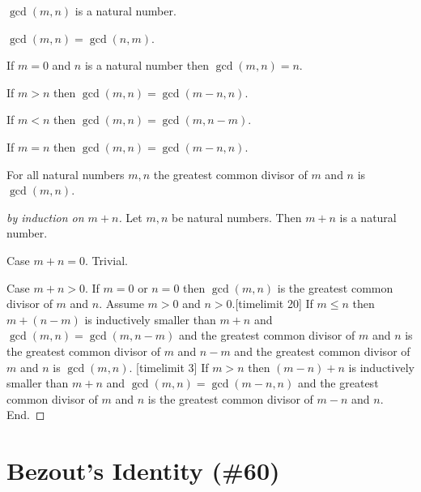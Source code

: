 \documentclass{article}
\begin{document}
\begin{forthel}
\begin{signature}
$\gcd(m,n)$ is a natural number.
\end{signature}

\begin{axiom}
$\gcd(m,n) = \gcd(n,m)$.
\end{axiom}

\begin{axiom}
If $m=0$ and $n$ is a natural number then $\gcd(m,n)=n$.
\end{axiom}
\begin{axiom}
If $m > n$ then $\gcd(m,n) = \gcd(m-n,n)$.
\end{axiom}
\begin{axiom}
If $m < n$ then $\gcd(m,n) = \gcd(m,n-m)$.
\end{axiom}
\begin{axiom}
If $m = n$ then $\gcd(m,n) = \gcd(m-n,n)$.
\end{axiom}


\begin{proposition}
For all natural numbers $m,n$ the greatest common divisor of $m$ and $n$ is $\gcd(m,n)$.
\end{proposition}
\begin{proof}[by induction on $m+n$]
Let $m,n$ be natural numbers.
Then $m+n$ is a natural number.

Case $m + n =0$. Trivial.

Case $m + n > 0$.
If $m=0$ or $n=0$ then $\gcd(m,n)$ is
the greatest common divisor of $m$ and $n$.
Assume $m>0$ and $n>0$.[timelimit 20]
If $m \leq n$ then $m + (n-m)$ is inductively smaller than $m + n$ and
$\gcd(m,n) = \gcd(m,n-m)$ and
the greatest common divisor of $m$ and $n$ is
the greatest common divisor of $m$ and $n-m$
and the greatest common divisor of $m$ and $n$ is $\gcd(m,n)$. [timelimit 3]
If $m > n$ then $(m-n) + n$ is inductively smaller than $m + n$ and
$\gcd(m,n) = \gcd(m-n,n)$ and
the greatest common divisor of $m$ and $n$ is
the greatest common divisor of $m-n$ and $n$. End.
\end{proof}
\end{forthel}


\section{Bezout's Identity (\#60)}
\end{document}
